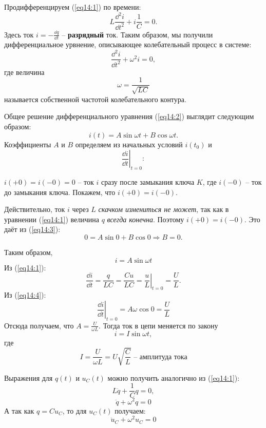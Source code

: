 	Продифференцируем (\ref{eq14:1}) по времени:
	\[
        L\frac{\dd ^2i}{\dd t^2} + i\frac{1}{C} = 0.
    \]
	Здесь ток \( i = -\frac{\dd q}{\dd t} \) -- \textbf{разрядный} ток.
	Таким образом, мы получили дифференциальное урвнение, описывающее
    колебательный процесс в системе:
	\begin{equation}
		\frac{\dd ^2i}{\dd t^2} + \omega^2i = 0, 
        \label{eq14:2}
	\end{equation}
	где величина
    \[
        \omega = \frac{1}{\sqrt{LC}}
    \] 
     называется собственной частотой колебательного контура.
	
	Общее решение дифференциального уравнения (\ref{eq14:2}) выглядит следующим
    образом:
	\begin{equation}
		i(t) = A\sin\omega t + B\cos\omega t.
        \label{eq14:3}
	\end{equation}
	Коэффициенты \( A \) и \( B \) определяем из начальных условий \( i(t_0) \)
    и 
    \[
        \left. \frac{\dd i}{\dd t}\right|_{t=0}:
    \]
	
	\( i(+0) = i(-0) = 0 \) -- ток \( i \) сразу после замыкания ключа \( K \),
    где \( i(-0) \) -- ток до замыкания ключа. Покажем, что \( i(+0) = i(-0) \).
	
	Действительно, ток \( i \) через \( L \) \textit{скачком измениться не
    может}, так как в уравнении (\ref{eq14:1}) величина \( q \) \textit{всегда
    конечна}. Поэтому \( i(+0) = i(-0) \). Это даёт из (\ref{eq14:3}):
	\[
        0 = A\sin0 + B\cos0 \Rightarrow B = 0.
    \]
	 
	Таким образом,
	\begin{equation}
		i = A\sin\omega t \label{eq14:4}
	\end{equation}
	Из (\ref{eq14:1}):
	\[
        \frac{\dd i}{\dd t} = \frac{q}{LC} = \frac{Cu}{LC} =
        \left.\frac{u}{L}\right|_{t = 0} = \frac{U}{L}.
    \]
	Из (\ref{eq14:4}):
	\[
        \left.\frac{\dd i}{\dd t}\right|_{t = 0} = A\omega\cos0  = \frac{U}{L}
    \]
	Отсюда получаем, что \( A = \frac{U}{\omega L} \). Тогда ток в цепи меняется
    по закону
	\begin{equation}
		i = I\sin\omega t,
        \label{eq14:5}
	\end{equation}
	где
    \[
        I = \frac{U}{\omega L} = U\sqrt{\frac{C}{L}}\text{ -- амплитуда тока}
    \]
	
	Выражения для \( q(t) \) и \( u_C(t) \) можно получить аналогично из
    (\ref{eq14:1}):
	\[
        L\ddot{q} + \frac{1}{C}q = 0,
    \]
	\begin{equation}
		\ddot{q} + \omega^2q = 0
	\end{equation}
	А так как \( q = Cu_C \), то для \( u_C(t) \) получаем:
	\begin{equation}
		\ddot{u}_C + \omega^2u_C = 0
	\end{equation}
	

